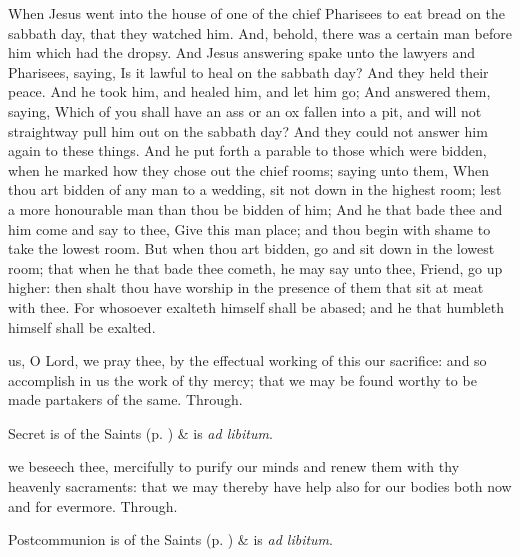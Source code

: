  When Jesus went into the house of one of the chief Pharisees to eat bread on the sabbath day, that they watched him. And, behold, there was a certain man before him which had the dropsy. And Jesus answering spake unto the lawyers and Pharisees, saying, Is it lawful to heal on the sabbath day? And they held their peace. And he took him, and healed him, and let him go; And answered them, saying, Which of you shall have an ass or an ox fallen into a pit, and will not straightway pull him out on the sabbath day? And they could not answer him again to these things. And he put forth a parable to those which were bidden, when he marked how they chose out the chief rooms; saying unto them, When thou art bidden of any man to a wedding, sit not down in the highest room; lest a more honourable man than thou be bidden of him; And he that bade thee and him come and say to thee, Give this man place; and thou begin with shame to take the lowest room. But when thou art bidden, go and sit down in the lowest room; that when he that bade thee cometh, he may say unto thee, Friend, go up higher: then shalt thou have worship in the presence of them that sit at meat with thee. For whosoever exalteth himself shall be abased; and he that humbleth himself shall be exalted.


\secret
{} us, O Lord, we pray thee, by the effectual working of this our sacrifice: and so accomplish in us the work of thy mercy; that we may be found worthy to be made partakers of the same. Through.
\begin{rubric}
     Secret is of the Saints (p. \pageref{SPSaints}) \&  is \emph{ad libitum}.
\end{rubric}

\postcommunion
{} we beseech thee, mercifully to purify our minds and renew them with thy heavenly sacraments: that we may thereby have help also for our bodies both now and for evermore. Through.
\begin{rubric}
     Postcommunion is of the Saints (p. \pageref{SPSaints}) \&  is \emph{ad libitum}.
\end{rubric}

